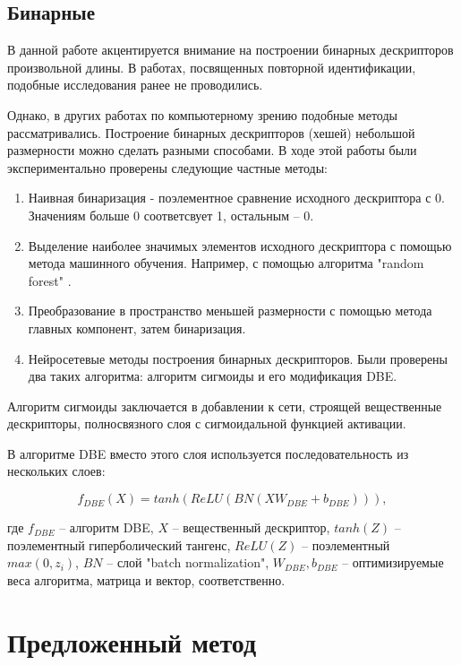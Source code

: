\documentclass[a4paper]{article}
\begin{document}
\begin{multicols*}{2}
\subsection{Бинарные}

В данной работе акцентируется внимание на построении бинарных дескрипторов произвольной длины. В работах, посвященных повторной идентификации, подобные исследования ранее не проводились.

Однако, в других работах по компьютерному зрению подобные методы рассматривались. Построение бинарных дескрипторов (хешей) небольшой размерности можно сделать разными способами. В ходе этой работы были экспериментально проверены следующие частные методы:

\begin{enumerate}
    \item Наивная бинаризация - поэлементное сравнение исходного дескриптора с 0. Значениям больше 0 соответсвует 1, остальным -- 0.
    \item Выделение наиболее значимых элементов исходного дескриптора с помощью метода машинного обучения. Например, с помощью алгоритма "random forest" \cite{randomforests}.
    \item Преобразование в пространство меньшей размерности с помощью метода главных компонент\cite{pca}, затем бинаризация.
    \item Нейросетевые методы построения бинарных дескрипторов. Были проверены два таких алгоритма: алгоритм сигмоиды\cite{deephash} и его модификация DBE\cite{dbe}.
\end{enumerate}

Алгоритм сигмоиды заключается в добавлении к сети, строящей вещественные дескрипторы, полносвязного слоя с сигмоидальной функцией активации.

В алгоритме DBE вместо этого слоя используется последовательность из нескольких слоев:

$$f_{DBE}(X) = tanh(ReLU(BN(X W_{DBE}+b_{DBE}))),$$

\begin{expl}
    \where где $f_{DBE}$ -- алгоритм DBE, $X$ -- вещественный дескриптор, $tanh(Z)$ -- поэлементный гиперболический тангенс, $ReLU(Z)$ -- поэлементный $max(0, z_i)$, $BN$ -- слой "batch normalization"\cite{batchnormalization}, $W_{DBE}, b_{DBE}$ -- оптимизируемые веса алгоритма, матрица и вектор, соответственно.
\end{expl}

\section{Предложенный метод}


\end{multicols*}
\end{document}
